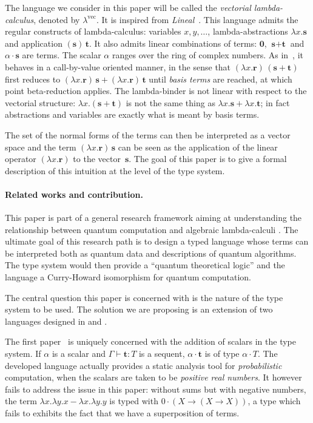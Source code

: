 \documentclass[colorlinks=true,linkcolor=black,urlcolor=black,citecolor=blue,submission,copyright,creativecommons]{eptcs}
\newcommand{\lvec}{\ensuremath{\lambda^{\!\!\textrm{vec}}}}
\newcommand{\ve}[1]{\mathrm{\textbf{#1}}}
\newcommand{\type}{\colon\!}
\begin{document}
The language we consider in this paper will be called the {\em
  vectorial lambda-calculus}, denoted by $\lvec$. It is
inspired from {\it Lineal}~\cite{ArrighiDowekRTA08}. This language
admits the regular constructs of lambda-calculus: variables
$x,y,\ldots$, lambda-abstractions $\lambda x.{\ve s}$ and application
$(\ve{s})\,\ve{t}$. It also admits linear combinations of terms:
$\ve{0}$, ${\ve s}+{\ve t}$ and $\alpha\cdot {\ve s}$ are terms. The
scalar $\alpha$ ranges over the ring of complex numbers. As in~\cite{ArrighiDowekRTA08}, it behaves in a
call-by-value oriented manner, in the sense that $(\lambda x.{\ve r})\,({\ve s}+{\ve t})$ first reduces to $(\lambda x.{\ve
  r})\,{\ve s}+(\lambda x.{\ve r})\,{\ve t}$ until {\em basis terms} are reached, at which point beta-reduction applies. The
lambda-binder is not linear with respect to the vectorial
structure: $\lambda x.(\ve{s}+\ve{t})$ is not the same thing as
$\lambda x.{\ve s}+\lambda x.{\ve t}$; in fact abstractions and variables are exactly what is meant by basis terms.

The set of the normal forms of the terms can then be interpreted as a vector space and the
term $(\lambda x.{\ve r})\,{\ve s}$ can be seen as the application of
the linear operator $(\lambda x.{\ve r})$ to the vector~${\ve s}$.
The goal of this paper is to give a formal description of this
intuition at the level of the type system.


\paragraph{Related works and contribution.}
This paper is part of a general research framework aiming at
understanding the relationship between quantum computation and
algebraic lambda-calculi
\cite{AltenkirchGrattageLICS05,ArrighiDowekRTA08,tonder04lambda,ValironQPL10}. The ultimate
goal of this research path is to design a typed language whose terms
can be interpreted both as quantum data and descriptions of quantum
algorithms. The type system would then provide a ``quantum theoretical logic'' and
the language a Curry-Howard isomorphism for quantum computation.

The central question this paper is concerned with is the nature of the
type system to be used. The solution we are proposing is an extension
of two languages designed in \cite{ArrighiDiazcaroQPL09} and
\cite{DiazcaroPetitWoLLIC12}.

The first paper~\cite{ArrighiDiazcaroQPL09} is uniquely concerned with the addition of
scalars in the type system. If $\alpha$ is a scalar and
$\Gamma\vdash\ve t\type T$ is a sequent, $\alpha\cdot\ve t$ is of type
$\alpha\cdot T$. The developed language actually provides a static analysis
tool for {\it probabilistic} computation, when the scalars are taken
to be {\it positive real numbers}. It however fails to address the issue in
this paper: without sums but with negative numbers, the term $\lambda
x.\lambda y.x-\lambda x.\lambda y.y$ is typed with $0\cdot(X\to(X\to
X))$, a type which fails to exhibits the fact that we have a superposition of terms.
\end{document}
